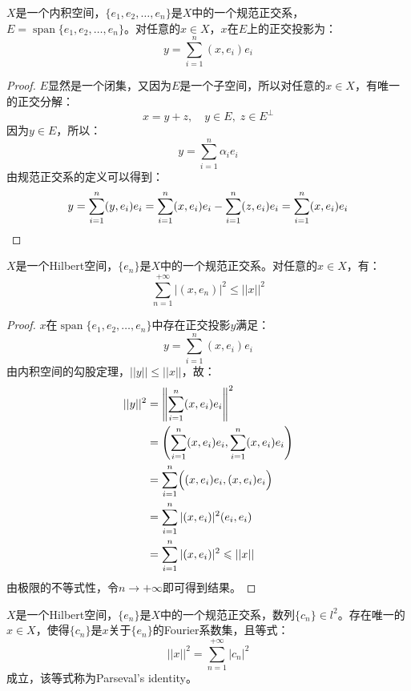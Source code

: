 \begin{theorem}
	$X$是一个内积空间，$\{e_1,e_2,\dots,e_n\}$是$X$中的一个规范正交系，$E=\operatorname{span}\{e_1,e_2,\dots,e_n\}$。对任意的$x\in X$，$x$在$E$上的正交投影为：
	\begin{equation*}
		y=\sum_{i=1}^{n}(x,e_i)e_i
	\end{equation*}
\end{theorem}
\begin{proof}
	$E$显然是一个闭集，又因为$E$是一个子空间，所以对任意的$x\in X$，有唯一的正交分解：
	\begin{equation*}
		x=y+z,\quad y\in E,\;z\in E^{\perp}
	\end{equation*}
	因为$y\in E$，所以：
	\begin{equation*}
		y=\sum_{i=1}^{n}\alpha_ie_i
	\end{equation*}
	由规范正交系的定义可以得到：
	\begin{equation*}
		y=\sum_{i=1}^{n}(y,e_i)e_i=\sum_{i=1}^{n}(x,e_i)e_i-\sum_{i=1}^{n}(z,e_i)e_i=\sum_{i=1}^{n}(x,e_i)e_i\qedhere
	\end{equation*}
\end{proof}
\begin{theorem}
	$X$是一个Hilbert空间，$\{e_n\}$是$X$中的一个规范正交系。对任意的$x\in X$，有：
	\begin{equation*}
		\sum_{n=1}^{+\infty}|(x,e_n)|^2\leqslant||x||^2
	\end{equation*}
\end{theorem}
\begin{proof}
	$x$在$\operatorname{span}\{e_1,e_2,\dots,e_n\}$中存在正交投影$y$满足：
	\begin{equation*}
		y=\sum_{i=1}^{n}(x,e_i)e_i
	\end{equation*}
	由内积空间的勾股定理，$||y||\leqslant||x||$，故：
	\begin{align*}
		||y||^2
		&=\left\|\sum_{i=1}^{n}(x,e_i)e_i\right\|^2 \\
		&=\left(\sum_{i=1}^{n}(x,e_i)e_i,\sum_{i=1}^{n}(x,e_i)e_i\right) \\
		&=\sum_{i=1}^n\Bigl((x,e_i)e_i,(x,e_i)e_i\Bigr) \\
		&=\sum_{i=1}^n|(x,e_i)|^2(e_i,e_i) \\
		&=\sum_{i=1}^n|(x,e_i)|^2\leqslant||x||
	\end{align*}
	由极限的不等式性，令$n\to+\infty$即可得到结果。
\end{proof}
\begin{theorem}\label{theo:Parseval's identity}
	$X$是一个Hilbert空间，$\{e_n\}$是$X$中的一个规范正交系，数列$\{c_n\}\in l^2$。存在唯一的$x\in X$，使得$\{c_n\}$是$x$关于$\{e_n\}$的Fourier系数集，且等式：
	\begin{equation*}
		||x||^2=\sum_{n=1}^{+\infty}|c_n|^2
	\end{equation*}
	成立，该等式称为Parseval's identity。
\end{theorem}
